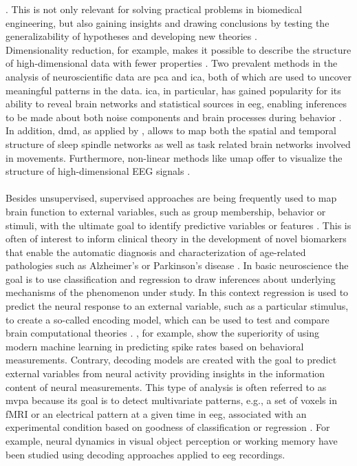 . This is not only relevant for solving practical problems in biomedical engineering, but also gaining insights and drawing conclusions by testing the generalizability of hypotheses and developing new theories \cite{Glaser2019, Hastie2009}. 
\\
Dimensionality reduction, for example, makes it possible to describe the structure of high-dimensional data with fewer properties \cite{Cunningham2014}. Two prevalent methods in the analysis of neuroscientific data are \gls{pca} and \gls{ica}, both of which are used to uncover meaningful patterns in the data. \Gls{ica}, in particular, has gained popularity for its ability to reveal brain networks and statistical sources in \gls{eeg}, enabling inferences to be made about both noise components and brain processes during behavior \cite{Strophal2018}. In addition, \gls{dmd}, as applied  by \citeauthor{Brunton2016} \cite{Brunton2016}, allows to map both the spatial and temporal structure of sleep spindle networks as well as task related brain networks involved in movements. Furthermore, non-linear methods like \gls{umap} offer to visualize the structure of high-dimensional EEG signals \cite{Banville2021}.\\
\\
Besides unsupervised, supervised approaches are being frequently used to map brain function to external variables, such as group membership, behavior or stimuli, with the ultimate goal to identify predictive variables or features \cite{Glaser2019}.
This is often of interest to inform clinical theory in the development of novel biomarkers that enable the automatic diagnosis and characterization of age-related pathologies such as Alzheimer's or Parkinson's disease \cite{Babiloni_AlzCons2021,Mei2021}. In basic neuroscience the goal is to use classification and regression to draw inferences about underlying mechanisms of the phenomenon under study. In this context regression is used to predict the neural response to an external variable, such as a particular stimulus, to create a so-called encoding model, which can be used to test and compare brain computational theories \cite{Kriegskorte2019, Naselaris2011}. \citeauthor{Benjamin2018} \cite{Benjamin2018}, for example, show the superiority of using modern machine learning in predicting spike rates based on behavioral measurements. Contrary, decoding models are created with the goal to predict external variables from neural activity providing insights in the information content of neural measurements. This type of analysis is often referred to as \gls{mvpa} because its goal is to detect multivariate patterns, e.g., a set of voxels in \gls{fMRI} or an electrical pattern at a given time in \gls{eeg}, associated with an experimental condition based on goodness of classification or regression \cite{Holdgraf2017}. For example, neural dynamics in visual object perception \cite{Cauchoix2014} or working memory \cite{Bae2018} have been studied using decoding approaches applied to \gls{eeg} recordings.\\


